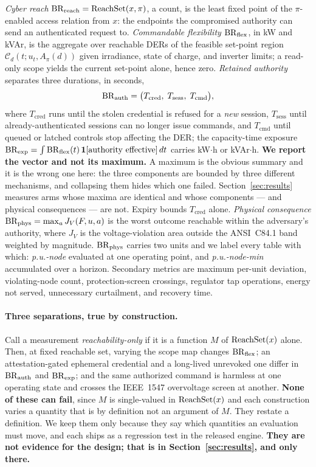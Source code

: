 \emph{Cyber reach} $\mathrm{BR}_{\mathrm{reach}}=\mathrm{ReachSet}(x,\pi)$, a count, is the least fixed point of the
$\pi$-enabled access relation from $x$: the endpoints the compromised authority can send an
authenticated request to. \emph{Commandable flexibility} $\mathrm{BR}_{\mathrm{flex}}$, in kW and kVAr, is the
aggregate over reachable DERs of the feasible set-point region
$\mathcal{C}_d(t;u_t,A_\pi(d))$ given irradiance, state of charge, and inverter limits; a
read-only scope yields the current set-point alone, hence zero. \emph{Retained authority}
separates three durations, in seconds,
\begin{equation}
\mathrm{BR}_{\mathrm{auth}}=\big(T_{\mathrm{cred}},\;T_{\mathrm{sess}},\;T_{\mathrm{cmd}}\big),
\end{equation}
where $T_{\mathrm{cred}}$ runs until the stolen credential is refused for a \emph{new} session,
$T_{\mathrm{sess}}$ until already-authenticated sessions can no longer issue commands, and
$T_{\mathrm{cmd}}$ until queued or latched controls stop affecting the DER; the capacity-time
exposure $\mathrm{BR}_{\mathrm{exp}}=\int \mathrm{BR}_{\mathrm{flex}}(t)\,\mathbf{1}[\text{authority effective}]\,dt$ carries
kW$\cdot$h or kVAr$\cdot$h. \textbf{We report the vector and not its maximum.} A maximum is the
obvious summary and it is the wrong one here: the three components are bounded by three different
mechanisms, and collapsing them hides which one failed. Section~\ref{sec:results} measures arms
whose maxima are identical and whose components --- and physical consequences --- are not. Expiry
bounds $T_{\mathrm{cred}}$ alone. \emph{Physical consequence} $\mathrm{BR}_{\mathrm{phys}}=\max_{a}J_V(F,u,a)$ is the worst
outcome reachable within the adversary's authority, where $J_V$ is the voltage-violation area
outside the ANSI~C84.1 band weighted by magnitude. $\mathrm{BR}_{\mathrm{phys}}$ carries two units and we label
every table with which: \emph{p.u.-node} evaluated at one operating point, and
\emph{p.u.-node-min} accumulated over a horizon. Secondary metrics are maximum per-unit
deviation, violating-node count, protection-screen crossings, regulator tap operations, energy not served,
unnecessary curtailment, and recovery time.

\paragraph{Three separations, true by construction.}
Call a measurement \emph{reachability-only} if it is a function $M$ of $\mathrm{ReachSet}(x)$ alone. Then, at
fixed reachable set, varying the scope map changes $\mathrm{BR}_{\mathrm{flex}}$; an attestation-gated ephemeral
credential and a long-lived unrevoked one differ in $\mathrm{BR}_{\mathrm{auth}}$ and $\mathrm{BR}_{\mathrm{exp}}$; and the same
authorized command is harmless at one operating state and crosses the IEEE~1547 overvoltage screen
at another. \textbf{None of these can fail}, since $M$ is single-valued in $\mathrm{ReachSet}(x)$ and each
construction varies a quantity that is by definition not an argument of $M$. They restate a
definition. We keep them only because they say which quantities an evaluation must move, and each
ships as a regression test in the released engine. \textbf{They are not evidence for the design;
that is in Section~\ref{sec:results}, and only there.}
